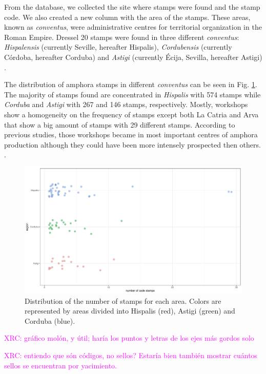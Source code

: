 \documentclass[review]{elsarticle}
\newcommand{\memo}[2]{\textcolor{#1}{#2}}
\newcommand{\xavi}[1]{\memo{magenta}{XRC: #1\\}}
\begin{document}
From the database, we collected the site where stamps were found and the stamp code. We also created a new column with the area of the stamps. These areas, known as \textit{conventus}, were administrative centres for territorial organization in the Roman Empire. Dressel 20 stamps were found in three different \textit{conventus}: \textit{Hispalensis} (currently Seville, hereafter Hispalis), \textit{Cordubensis} (currently C\'ordoba, hereafter Corduba) and \textit{Astigi} (currently Écija, Sevilla, hereafter Astigi) \citep{rodriguez_economioleicola_1977,chic_datos_2001,berni_millet_epigrafianforica_2008} .

The distribution of amphora stamps in different \textit{conventus} can be seen in Fig. \ref{frequency}. The majority of stamps found are concentrated in \textit{Hispalis} with 574 stamps while \textit{Corduba} and \textit{Astigi} with 267 and 146 stamps, respectively. Mostly, workshops show a homogeneity on the frequency of stamps except both La Catria and Arva that show a big amount of stamps with 29 different stamps. According to previous studies, those workshops became in most important centres of amphora production although they could have been more intensely prospected then others. \citep{arva_1997}.
 
\begin{figure}[htp]
	\centering
\includegraphics[width=\linewidth]{figs/frequency}
\caption{Distribution of the number of stamps for each area. Colors are represented by areas divided into Hispalis (red), Astigi (green) and Corduba (blue).}
\label{frequency}
\end{figure} 

\xavi{gráfico molón, y útil; haría los puntos y letras de los ejes más gordos solo}

\xavi{entiendo que són códigos, no sellos? Estaría bien también mostrar cuántos sellos se encuentran por yacimiento.}
\end{document}
